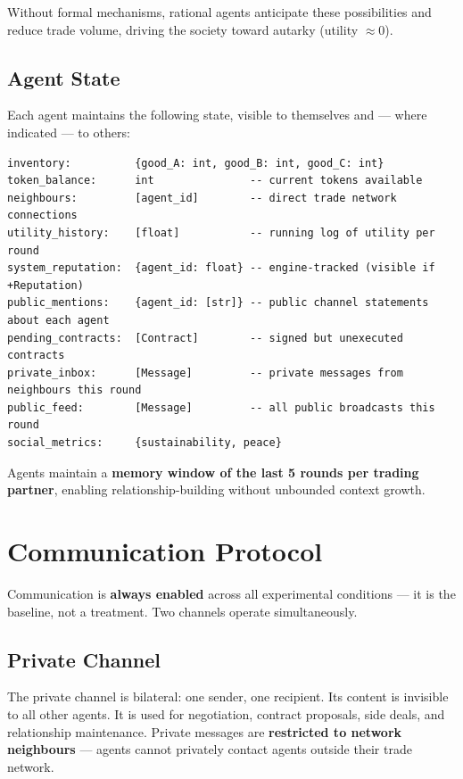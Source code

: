 \documentclass[12pt, a4paper]{article}
\begin{document}
Without formal mechanisms, rational agents anticipate these possibilities and reduce trade volume, driving the society toward autarky (utility $\approx 0$).

\subsection{Agent State}

Each agent maintains the following state, visible to themselves and — where indicated — to others:

\begin{lstlisting}[basicstyle=\ttfamily\small, breaklines=true]
inventory:          {good_A: int, good_B: int, good_C: int}
token_balance:      int               -- current tokens available
neighbours:         [agent_id]        -- direct trade network connections
utility_history:    [float]           -- running log of utility per round
system_reputation:  {agent_id: float} -- engine-tracked (visible if +Reputation)
public_mentions:    {agent_id: [str]} -- public channel statements about each agent
pending_contracts:  [Contract]        -- signed but unexecuted contracts
private_inbox:      [Message]         -- private messages from neighbours this round
public_feed:        [Message]         -- all public broadcasts this round
social_metrics:     {sustainability, peace}
\end{lstlisting}

Agents maintain a \textbf{memory window of the last 5 rounds per trading partner}, enabling relationship-building without unbounded context growth.

\section{Communication Protocol}
\label{sec:communication}

Communication is \textbf{always enabled} across all experimental conditions — it is the baseline, not a treatment. Two channels operate simultaneously.

\subsection{Private Channel}

The private channel is bilateral: one sender, one recipient. Its content is invisible to all other agents. It is used for negotiation, contract proposals, side deals, and relationship maintenance. Private messages are \textbf{restricted to network neighbours} — agents cannot privately contact agents outside their trade network.
\end{document}

